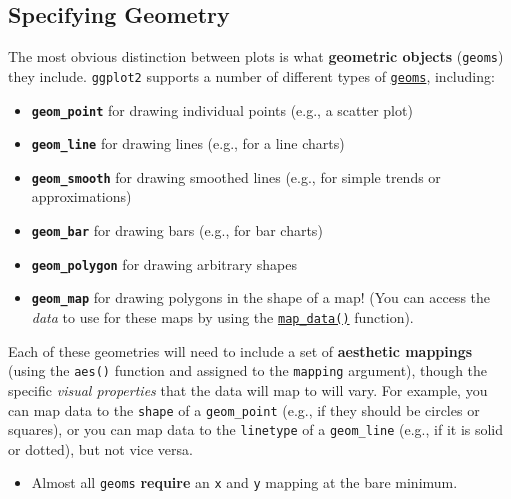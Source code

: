 \documentclass[]{book}
\providecommand{\tightlist}{%
  \setlength{\itemsep}{0pt}\setlength{\parskip}{0pt}}
\theoremstyle{definition}
\theoremstyle{definition}
\theoremstyle{remark}
\begin{document}
\subsection{Specifying Geometry}\label{specifying-geometry}

The most obvious distinction between plots is what \textbf{geometric
objects} (\texttt{geoms}) they include. \texttt{ggplot2} supports a
number of different types of
\href{http://ggplot2.tidyverse.org/reference/index.html\#section-layer-geoms}{\texttt{geoms}},
including:

\begin{itemize}
\tightlist
\item
  \textbf{\texttt{geom\_point}} for drawing individual points (e.g., a
  scatter plot)
\item
  \textbf{\texttt{geom\_line}} for drawing lines (e.g., for a line
  charts)
\item
  \textbf{\texttt{geom\_smooth}} for drawing smoothed lines (e.g., for
  simple trends or approximations)
\item
  \textbf{\texttt{geom\_bar}} for drawing bars (e.g., for bar charts)
\item
  \textbf{\texttt{geom\_polygon}} for drawing arbitrary shapes
\item
  \textbf{\texttt{geom\_map}} for drawing polygons in the shape of a
  map! (You can access the \emph{data} to use for these maps by using
  the
  \href{http://ggplot2.tidyverse.org/reference/map_data.html}{\texttt{map\_data()}}
  function).
\end{itemize}

Each of these geometries will need to include a set of \textbf{aesthetic
mappings} (using the \texttt{aes()} function and assigned to the
\texttt{mapping} argument), though the specific \emph{visual properties}
that the data will map to will vary. For example, you can map data to
the \texttt{shape} of a \texttt{geom\_point} (e.g., if they should be
circles or squares), or you can map data to the \texttt{linetype} of a
\texttt{geom\_line} (e.g., if it is solid or dotted), but not vice
versa.

\begin{itemize}
\tightlist
\item
  Almost all \texttt{geoms} \textbf{require} an \texttt{x} and
  \texttt{y} mapping at the bare minimum.
\end{itemize}
\end{document}
